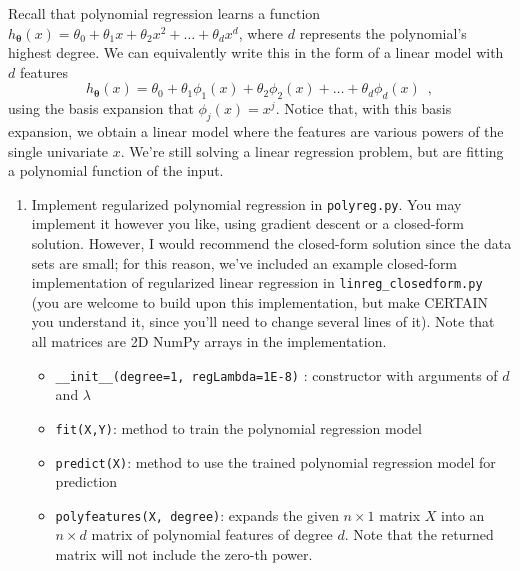 \documentclass{article}
\begin{document}
\begin{aprob}
    Recall that polynomial regression learns a function $h_{\bm{\theta}}(x) = \theta_0 + \theta_1 x + \theta_2 x^2 + \ldots + \theta_d x^d$, where $d$ represents the polynomial's highest degree.  We can equivalently write this in the form of a  linear model with $d$ features
    \begin{equation}
        h_{\bm{\theta}}(x) = \theta_0 + \theta_1 \phi_1(x)  + \theta_2 \phi_2(x)  + \ldots + \theta_d \phi_d(x)  \enspace ,
    \end{equation}
    using the basis expansion that $\phi_j(x) = x^j$.  Notice that, with this basis expansion, we obtain a linear model where the features are various powers of the single univariate $x$.  We're still solving a linear regression problem, but are fitting a polynomial function of the input.\\
    
    \begin{enumerate}
        \item {} Implement regularized polynomial regression in \texttt{polyreg.py}.  You may implement it however you like, using gradient descent or a closed-form solution.  However, I would recommend the closed-form solution since the data sets are small; for this reason, we've included an example closed-form implementation of regularized linear regression in \texttt{linreg\_closedform.py} (you are welcome to build upon this implementation, but make CERTAIN you understand it, since you'll need to change several lines of it). Note that all matrices are 2D NumPy arrays in the implementation.\\
    
    \begin{itemize}[noitemsep, nolistsep]
        \item \texttt{\_\_init\_\_(degree=1, regLambda=1E-8)} : constructor with arguments of $d$ and $\lambda$
        \item \texttt{fit(X,Y)}: method to train the polynomial regression model
        \item \texttt{predict(X)}: method to use the trained polynomial regression model for prediction
        \item \texttt{polyfeatures(X, degree)}: expands the given $n \times 1$ matrix $X$ into an $n \times d$ matrix of polynomial features of degree $d$.  Note that the returned matrix will not include the zero-th power.\\
    \end{itemize}
    

\end{enumerate}
\end{aprob}
\end{document}
